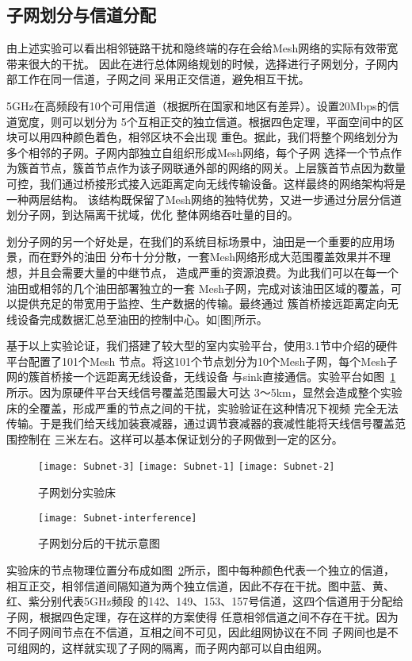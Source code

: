 \subsection{子网划分与信道分配}
由上述实验可以看出相邻链路干扰和隐终端的存在会给Mesh网络的实际有效带宽带来很大的干扰。
因此在进行总体网络规划的时候，选择进行子网划分，子网内部工作在同一信道，子网之间
采用正交信道，避免相互干扰。

5GHz在高频段有10个可用信道（根据所在国家和地区有差异）。设置20Mbps的信道宽度，则可以划分为
5个互相正交的独立信道。根据四色定理，平面空间中的区块可以用四种颜色着色，相邻区块不会出现
重色。据此，我们将整个网络划分为多个相邻的子网。子网内部独立自组织形成Mesh网络，每个子网
选择一个节点作为簇首节点，簇首节点作为该子网联通外部的网络的网关。上层簇首节点因为数量
可控，我们通过桥接形式接入远距离定向无线传输设备。这样最终的网络架构将是一种两层结构。
该结构既保留了Mesh网络的独特优势，又进一步通过分层分信道划分子网，到达隔离干扰域，优化
整体网络吞吐量的目的。

划分子网的另一个好处是，在我们的系统目标场景中，油田是一个重要的应用场景，而在野外的油田
分布十分分散，一套Mesh网络形成大范围覆盖效果并不理想，并且会需要大量的中继节点，
造成严重的资源浪费。为此我们可以在每一个油田或相邻的几个油田部署独立的一套
Mesh子网，完成对该油田区域的覆盖，可以提供充足的带宽用于监控、生产数据的传输。最终通过
簇首桥接远距离定向无线设备完成数据汇总至油田的控制中心。如[图]所示。

基于以上实验论证，我们搭建了较大型的室内实验平台，使用3.1节中介绍的硬件平台配置了101个Mesh
节点。将这101个节点划分为10个Mesh子网，每个Mesh子网的簇首桥接一个远距离无线设备，无线设备
与sink直接通信。实验平台如图~\ref{fig:subnet}所示。因为原硬件平台天线信号覆盖范围最大可达
3～5km，显然会造成整个实验床的全覆盖，形成严重的节点之间的干扰，实验验证在这种情况下视频
完全无法传输。于是我们给天线加装衰减器，通过调节衰减器的衰减性能将天线信号覆盖范围控制在
三米左右。这样可以基本保证划分的子网做到一定的区分。

\begin{figure}[h]
  \centering
  \subcaptionbox{}
      {\texttt{[image: Subnet-3]}}
  \hspace{1em}
  \subcaptionbox{}
    {\texttt{[image: Subnet-1]}}
  \hspace{1em}
  \subcaptionbox{}
    {\texttt{[image: Subnet-2]}}
  \caption{子网划分实验床}
  \label{fig:subnet}
\end{figure}

\begin{figure}[H] %
  \centering
  \texttt{[image: Subnet-interference]}
  \caption{子网划分后的干扰示意图}
  \label{fig:subnet_interference}
\end{figure}
实验床的节点物理位置分布成如图~\ref{fig:subnet_interference}所示，图中每种颜色代表一个独立的信道，
相互正交，相邻信道间隔知道为两个独立信道，因此不存在干扰。图中蓝、黄、红、紫分别代表5GHz频段
的142、149、153、157号信道，这四个信道用于分配给子网，根据四色定理，存在这样的方案使得
任意相邻信道之间不存在干扰。因为不同子网间节点在不信道，互相之间不可见，因此组网协议在不同
子网间也是不可组网的，这样就实现了子网的隔离，而子网内部可以自由组网。

